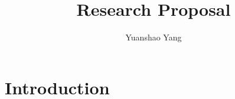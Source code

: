\documentclass{article}
\title{Research Proposal}
\author{Yuanshao Yang}
\affil{Mechanical Engineering, Univereity of Michigan}
\date{}
\begin{document}
\maketitle


\section{Introduction}
    
    
    
    

\end{document}
